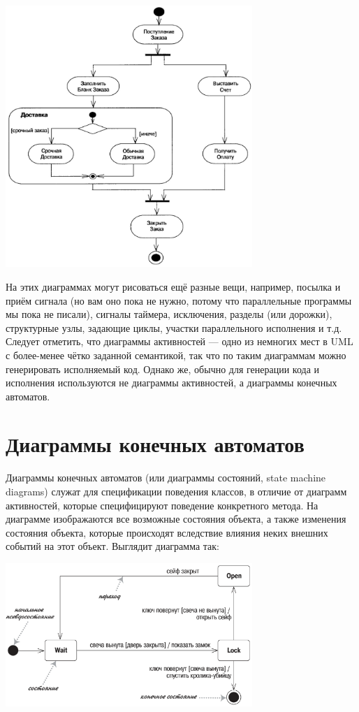 \documentclass[a5paper]{article}
\begin{document}
\begin{center}
	\includegraphics[width=0.7\textwidth]{activitySubdiagrams.png}
\end{center}

На этих диаграммах могут рисоваться ещё разные вещи, например, посылка и приём сигнала (но вам оно пока не нужно, потому что параллельные программы мы пока не писали), сигналы таймера, исключения, разделы (или дорожки), структурные узлы, задающие циклы, участки параллельного исполнения и т.д. Следует отметить, что диаграммы активностей --- одно из немногих мест в UML с более-менее чётко заданной семантикой, так что по таким диаграммам можно генерировать исполняемый код. Однако же, обычно для генерации кода и исполнения используются не диаграммы активностей, а диаграммы конечных автоматов.

\section{Диаграммы конечных автоматов}

Диаграммы конечных автоматов (или диаграммы состояний, state machine diagrams) служат для спецификации поведения классов, в отличие от диаграмм активностей, которые специфицируют поведение конкретного метода. На диаграмме изображаются все возможные состояния объекта, а также изменения состояния объекта, которые происходят вследствие влияния неких внешних событий на этот объект. Выглядит диаграмма так:

\begin{center}
	\includegraphics[width=0.7\textwidth]{stateTransitionSyntax.png}
\end{center}
\end{document}
